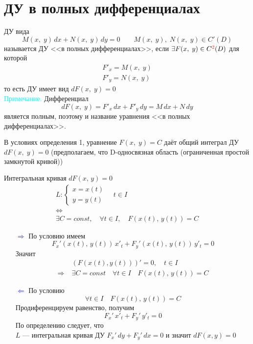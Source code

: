 \section{ДУ в полных дифференциалах}
\begin{Def}
    ДУ вида
    \[
        M(x,\;y)\,dx+N(x,\;y)\,dy=0 \qquad M(x,\;y),\; N(x,\;y)\in C'(D)
    \] 
    называется ДУ <<в полных дифференциалах>>, если $\exists F(x,\;y) \in C^{\textcolor{red}{2}}(D)$ для которой
    \begin{gather*}
        F'_x=M(x,\;y)\\
        F'_y=N(x,\;y)
    \end{gather*}
    то есть ДУ имеет вид $dF(x,\;y)=0$\\
    
    \textcolor{cyan}{Примечание.} Дифференциал \[dF(x,\;y)=F'_x\,dx+F'_y\, dy=M\,dx+N\,dy\] является полным, поэтому и название уравнения <<в полных дифференциалах>>.
\end{Def}

\begin{Th}
    В условиях определения 1, уравнение $F(x,\;y) = C$ даёт общий интеграл ДУ $dF(x,\;y)=0$ (предполагаем, что D-односвязная область (ограниченная простой замкнутой кривой))
\end{Th}

\begin{Proof}
    Интегральная кривая $dF(x,\, y) = 0$
    \begin{gather*}
        L:
        \begin{cases}
            x=x(t)\\
            y=y(t) 
        \end{cases} \quad t\in I\\
        \Leftrightarrow\\
        \exists C = const, \quad \forall t \in I, \quad F(x(t),\, y(t))= C
    \end{gather*}
    \begin{enumerate}
        \item[\textcolor{blue}{$\Rightarrow$}]
        По условию имеем
        \[
            F_x'(x(t),\,y(t))\,x'_t+F_y'(x(t),\,y(t))\,y'_t=0
        \]
        Значит
        \begin{align*}
            &(F(x(t),y(t)))'=0, \quad t \in I\\
            \Rightarrow \; &\exists C = const \quad \forall t \in I \quad F(x(t),\, y(t)) = C
        \end{align*}
        
        \item[\textcolor{blue}{$\Leftarrow$}] По условию 
        \[
            \forall t \in I \quad F(x(t),\, y(t))= C
        \]
        Продиференцируем равенство, получим
        \[
            F_x'\,x'_t + F_y'\,y'_t = 0
        \]
        По определению следует, что\\
        $L$ --- интегральная кривая ДУ $F_x'\,dy+F_y'\,dx = 0$ и значит $dF(x,y)=0$
    \end{enumerate}
\end{Proof}

